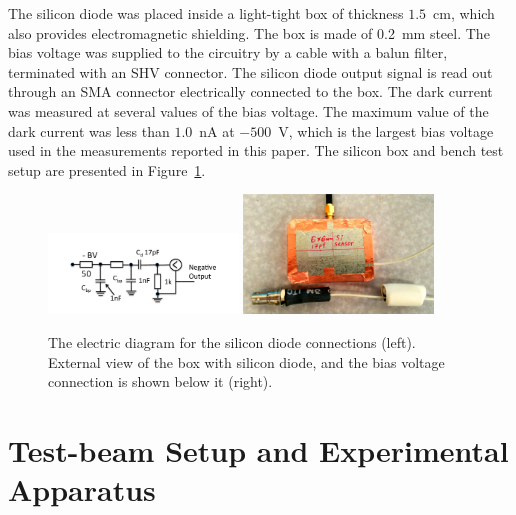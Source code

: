 \documentclass[12pt]{article}
\begin{document}
{The silicon diode was placed inside a light-tight box of thickness $1.5$~cm,
which also provides electromagnetic shielding. The box is made of 0.2~mm steel.
The bias voltage was supplied to the circuitry by a cable with a balun filter,
terminated with an SHV connector. The silicon diode output signal is read out
through an SMA connector electrically connected to the box. The dark current was
measured at several values of the bias voltage. The maximum value of the dark
current was less than $1.0$~nA at $-500$~V, which is the largest bias voltage
used in the measurements reported in this paper. The silicon box and bench test
setup are presented in Figure~\ref{fig:SiliconPad}. 

\begin{figure}[htbp] 
\centering
\includegraphics[width=0.45\textwidth]{plots/SiliconDiodeDiagram.pdf} 
\includegraphics[width=0.45\textwidth]{plots/SiliconDiodeBox.jpg} 
\caption{The electric diagram for the silicon diode connections (left). External
view of the box with silicon diode, and the bias voltage connection is shown
below it (right).} 
\label{fig:SiliconPad} 
\end{figure} 




\section{Test-beam Setup and Experimental Apparatus }
\label{sec:tbeam}


}
\end{document}
